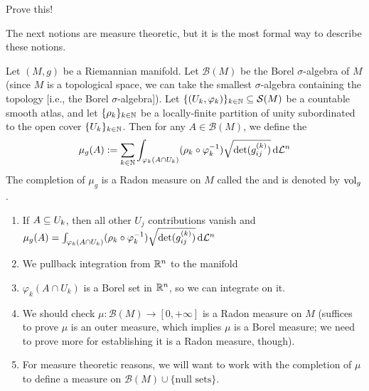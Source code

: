 \begin{xca}
Prove this!
\end{xca}

\begin{node}
The next notions are measure theoretic, but it is the most formal way
to describe these notions.
\end{node}

\begin{definition}
Let $(M,g)$ be a Riemannian manifold. Let $\mathcal{B}(M)$ be the
Borel $\sigma$-algebra of $M$ (since $M$ is a topological space, we
can take the smallest $\sigma$-algebra containing the topology [i.e.,
  the Borel $\sigma$-algebra]).
Let $\{(U_{k},\varphi_{k})\}_{k\in\mathbb{N}}\subseteq\mathcal{S}(M)$ be a
countable smooth atlas, and let $\{\rho_{k}\}_{k\in\mathbb{N}}$ be a
locally-finite partition of unity subordinated to the open cover
$\{U_{k}\}_{k\in\mathbb{N}}$. Then for any $A\in\mathcal{B}(M)$, we define
the
\begin{equation}
  \mu_{g}(A):=\sum_{k\in\mathbb{N}}\int_{\varphi_{k}(A\cap U_{k})}(\rho_{k}\circ\varphi^{-1}_{k})\sqrt{\det(g^{(k)}_{ij})}\,\mathrm{d}\mathcal{L}^{n}
\end{equation}
The completion of $\mu_{g}$ is a Radon measure on $M$ called the
 and is denoted by $\operatorname{vol}_{g}$.
\end{definition}

\begin{remark}
\begin{enumerate}
\item If $A\propersubset U_{k}$, then all other $U_{j}$ contributions
  vanish and $\mu_{g}(A)=\int_{\varphi_{k}(A\cap U_{k})}(\rho_{k}\circ\varphi^{-1}_{k})\sqrt{\det(g^{(k)}_{ij})}\,\mathrm{d}\mathcal{L}^{n}$
\item We pullback integration from $\mathbb{R}^{n}$ to the manifold
\item $\varphi_{k}(A\cap U_{k})$ is a Borel set in $\mathbb{R}^{n}$, so we
  can integrate on it.
\item We should check $\mu\colon\mathcal{B}(M)\to[0,+\infty]$ is a
  Radon measure on $M$ (suffices to prove $\mu$ is an outer measure,
  which implies $\mu$ is a Borel measure; we need to prove more for
  establishing it is a Radon measure, though).
\item For measure theoretic reasons, we will want to work with the
  completion of $\mu$ to define a measure on
  $\mathcal{B}(M)\cup\{\mbox{null sets}\}$.
\end{enumerate}
\end{remark}


